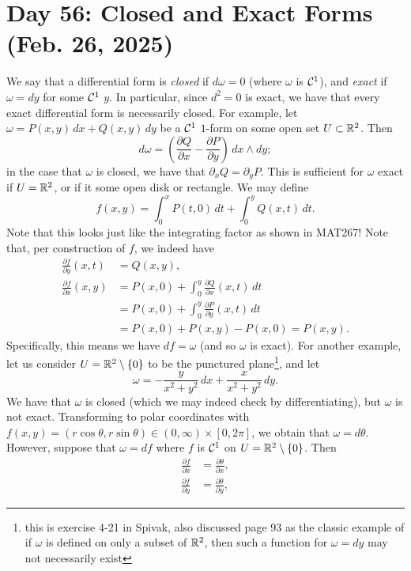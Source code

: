 \section{Day 56: Closed and Exact Forms (Feb. 26, 2025)}
We say that a differential form is \textit{closed} if $d\omega = 0$ (where $\omega$ is $\mathcal C^1$), and \textit{exact} if $\omega = dy$ for some $\mathcal C^1$ $y$. In particular, since $d^2 = 0$ is exact, we have that every exact differential form is necessarily closed. For example, let $\omega = P(x, y) \, dx + Q(x, y) \, dy$ be a $\mathcal C^1$ $1$-form on some open set $U \subset \mathbb R^2$. Then
\[ d\omega = \left(\frac{\partial Q}{\partial x} - \frac{\partial P}{\partial y}\right) \, dx \wedge dy; \]
in the case that $\omega$ is closed, we have that $\partial_x Q = \partial_y P$. This is sufficient for $\omega$ exact if $U = \mathbb R^2$, or if it some open disk or rectangle. We may define
\[ f(x, y) = \int_0^x P(t, 0) \, dt + \int_0^y Q(x, t) \, dt. \]
Note that this looks just like the integrating factor as shown in MAT267! Note that, per construction of $f$, we indeed have
\begin{align*}
    \frac{\partial f}{\partial y}(x, t) &= Q(x, y), \\
    \frac{\partial f}{\partial x}(x, y) &= P(x, 0) + \int_0^y \frac{\partial Q}{\partial x} (x, t) \, dt \\
    &= P(x, 0) + \int_0^y \frac{\partial P}{\partial y}(x, t) \, dt \\
    &= P(x, 0) + P(x, y) - P(x, 0) = P(x, y).
\end{align*}
Specifically, this means we have $df = \omega$ (and so $\omega$ is exact). For another example, let us consider $U = \mathbb R^2 \setminus \{0\}$ to be the punctured plane\footnote{this is exercise 4-21 in Spivak, also discussed page 93 as the classic example of if $\omega$ is defined on only a subset of $\mathbb R^2$, then such a function for $\omega = dy$ may not necessarily exist}, and let
\[ \omega = -\frac{y}{x^2 + y^2} \, dx + \frac{x}{x^2 + y^2} \, dy. \]
We have that $\omega$ is closed (which we may indeed check by differentiating), but $\omega$ is not exact. Transforming to polar coordinates with $f(x, y) = (r \cos \theta, r \sin \theta) \in (0, \infty) \times [0, 2\pi]$, we obtain that $\omega = d \theta$. However, suppose that $\omega = df$ where $f$ is $\mathcal C^1$ on $U = \mathbb R^2 \setminus \{0\}$. Then
\begin{align*}
    \frac{\partial f}{\partial x} &= \frac{\partial \theta}{\partial x}, \\
    \frac{\partial f}{\partial y} &= \frac{\partial \theta}{\partial y},
\end{align*}
